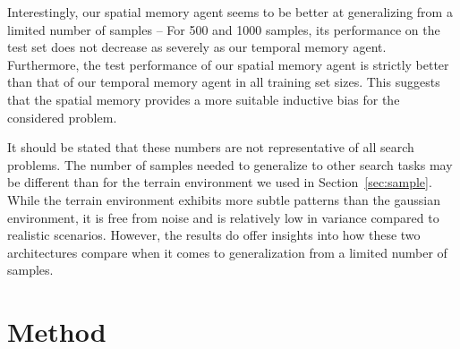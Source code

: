 Interestingly, our spatial memory agent seems to be better at generalizing from a limited number of samples --
For 500 and 1000 samples, its performance on the test set does not decrease as severely as our temporal memory agent.
Furthermore, the test performance of our spatial memory agent is strictly better than that of our temporal memory agent in all training set sizes.
This suggests that the spatial memory provides a more suitable inductive bias for the considered problem.

It should be stated that these numbers are not representative of all search problems.
The number of samples needed to generalize to other search tasks may be different than for the terrain environment we used in Section~\ref{sec:sample}.
While the terrain environment exhibits more subtle patterns than the gaussian environment, it is free from noise and is relatively low in variance compared to realistic scenarios.
However, the results do offer insights into how these two architectures compare when it comes to generalization from a limited number of samples.

\section{Method}
\label{sec:discussion-method}

